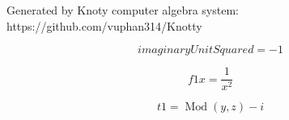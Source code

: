 \documentclass[letterpaper, 10pt]{extarticle}
\begin{document}
Generated by Knoty computer algebra system:
https://github.com/vuphan314/Knotty

\bigskip

\begin{dmath*}
imaginaryUnitSquared =
    -1
\end{dmath*}


\begin{dmath*}
f1x =
    \frac{1}{x^{2}}
\end{dmath*}


\begin{dmath*}
t1 =
    \operatorname{Mod}{\left (y,z \right )} - i
\end{dmath*}
\end{document}
